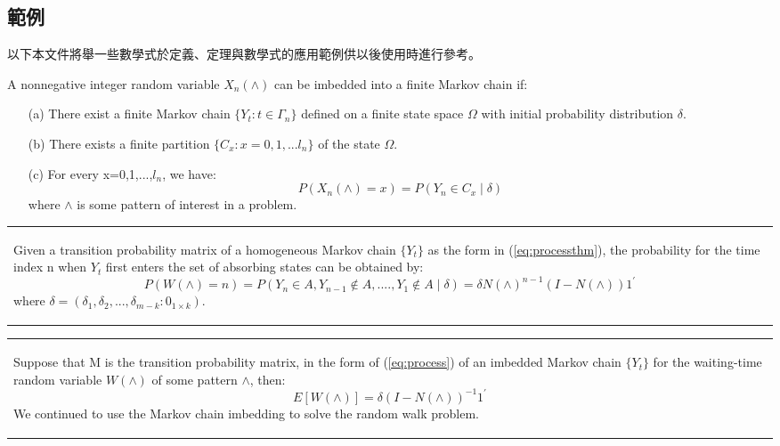 \subsection{範例}

以下本文件將舉一些數學式於定義、定理與數學式的應用範例供以後使用時進行參考。

\begin{de}
A nonnegative integer random variable $X_n(\land)$ can be imbedded into a finite Markov chain if:
\begin{itemize}
\item[(a)] There exist a finite Markov chain $\{Y_t : t \in \Gamma_n\}$ defined on a finite state space $\Omega$ with initial probability distribution $\delta$.
\item[(b)] There exists a finite partition $\{C_x : x=0,1,...l_n\}$ of the state $\Omega$.
\item[(c)] For every x=0,1,...,$l_n$, we have:
  \begin{equation}\label{eq:processthm}
    P(X_n(\land)=x)=P(Y_n \in C_x \mid \delta) 
  \end{equation}
where $\land$ is some pattern of interest in a problem.

\end{itemize}
\end{de}

\bigskip
\begin{center}\colorbox{slight}{\begin{tabular}{p{}}
\begin{thm}\label{thm:demo_refff}
Given a transition probability matrix of a homogeneous Markov chain $\{Y_t\}$ as the form in (\ref{eq:processthm}), the probability for the time index n when $Y_t$  first enters the set of absorbing states can be obtained by:
  \begin{equation}\label{eq:process}
    P(W(\land)=n)=P(Y_n \in A, Y_{n-1} \not\in A,....,Y_1 \not\in A \mid \delta)=\delta N(\land)^{n-1}(I-N(\land))1^{'}
  \end{equation}
where $\delta=(\delta_1,\delta_2,...,\delta_{m-k}:0_{1\times k})$.
\end{thm}
 \end{tabular}}\end{center}
\bigskip


\bigskip
\begin{center}\colorbox{slight}{\begin{tabular}{p{}}
\begin{thm}\label{thm:demo_ref}
Suppose that M is the transition probability matrix, in the form of (\ref{eq:process}) of an imbedded Markov chain $\{Y_t\}$ for the waiting-time random variable $W(\land)$ of some pattern $\land$, then:  
  \begin{equation}\label{eq:equation3}
    E[W(\land)]=\delta (I-N(\land))^{-1}1^{'}
  \end{equation}
We continued to use the Markov chain imbedding to solve the random walk problem.
\end{thm}
 \end{tabular}}\end{center}
\bigskip


